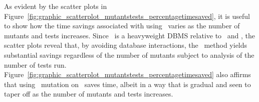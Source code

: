 
 As evident by the scatter plots in
Figure~\ref{fig:graphic_scatterplot_mutantstests_percentagetimesaved}, it is useful to show how the time savings
associated with using \virtualmutationanalysis~varies as the number of mutants and tests increases. Since \postgres~is a
heavyweight DBMS relative to \HyperSQL~and \sqlite, the scatter plots reveal that, by avoiding database interactions,
the \virtual~method yields substantial savings regardless of the number of mutants subject to analysis of the number of
tests run.  Figure~\ref{fig:graphic_scatterplot_mutantstests_percentagetimesaved} also affirms that using
\virtual~mutation on \HyperSQL~saves time, albeit in a way that is gradual and seen to taper off as the number
of mutants and tests increases.







